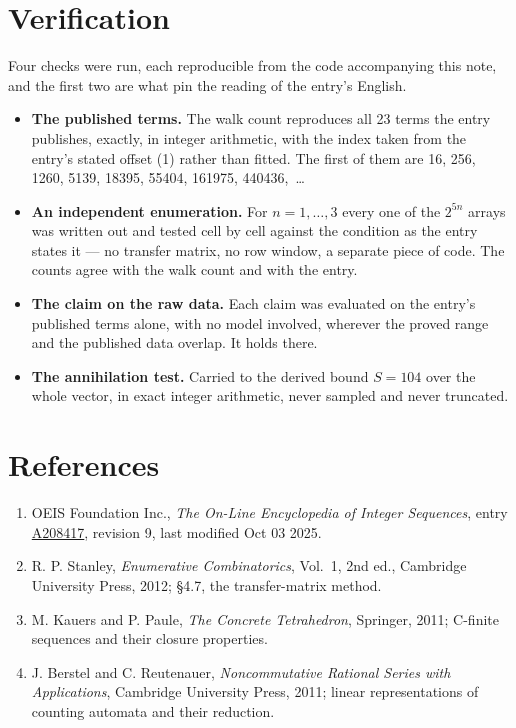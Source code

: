 \documentclass[11pt]{article}
\theoremstyle{definition}
\begin{document}
\section{Verification}

Four checks were run, each reproducible from the code accompanying this note, and the first two are what pin the reading of the entry's English.

\begin{itemize}

\item {\bfseries The published terms.} The walk count reproduces all 23 terms the entry publishes, exactly, in integer arithmetic, with the index taken from the entry's stated offset (1) rather than fitted. The first of them are 16, 256, 1260, 5139, 18395, 55404, 161975, 440436,~\dots

\item {\bfseries An independent enumeration.} For $n = 1,\dots,3$ every one of the $2^{5n}$ arrays was written out and tested cell by cell against the condition as the entry states it --- no transfer matrix, no row window, a separate piece of code. The counts agree with the walk count and with the entry.

\item {\bfseries The claim on the raw data.} Each claim was evaluated on the entry's published terms alone, with no model involved, wherever the proved range and the published data overlap. It holds there.

\item {\bfseries The annihilation test.} Carried to the derived bound $S = 104$ over the whole vector, in exact integer arithmetic, never sampled and never truncated.

\end{itemize}

\section{References}

\begin{enumerate}

\item OEIS Foundation Inc., \emph{The On-Line Encyclopedia of Integer Sequences}, entry \href{https://oeis.org/A208417}{A208417}, revision 9, last modified Oct 03 2025.

\item R. P. Stanley, \emph{Enumerative Combinatorics}, Vol.~1, 2nd ed., Cambridge University Press, 2012; \S4.7, the transfer-matrix method.

\item M. Kauers and P. Paule, \emph{The Concrete Tetrahedron}, Springer, 2011; C-finite sequences and their closure properties.

\item J. Berstel and C. Reutenauer, \emph{Noncommutative Rational Series with Applications}, Cambridge University Press, 2011; linear representations of counting automata and their reduction.

\end{enumerate}
\end{document}
